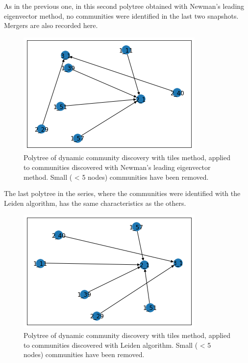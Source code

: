 \documentclass[sigchi]{acmart}
\begin{document}
As in the previous one, in this second polytree obtained with Newman's leading eigenvector method, no communities were identified in the last two snapshots. Mergers are also recorded here.

\begin{figure}[H]
	\centering
	\includegraphics[width=\linewidth]{polyt eig tiles.png}
	\caption{Polytree of dynamic community discovery with tiles method, applied to communities discovered with Newman’s leading eigenvector method. Small ( < 5 nodes) communities have been removed.}
\end{figure}

The last polytree in the series, where the communities were identified with the Leiden algorithm, has the same characteristics as the others.

\begin{figure}[H]
	\centering
	\includegraphics[width=\linewidth]{polyt lei tiles.png}
	\caption{Polytree of dynamic community discovery with tiles method, applied to communities discovered with Leiden algorithm. Small ( < 5 nodes) communities have been removed.}
\end{figure}
\end{document}

